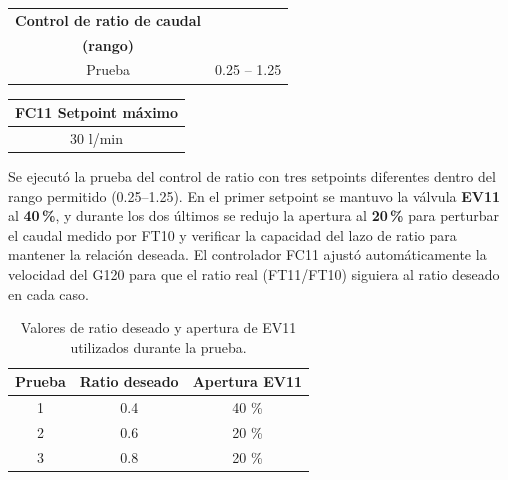 \begin{enumerate}[label=\alph*)]
    \begin{center}
    \renewcommand{\arraystretch}{1.2}
    \begin{tabular}{|c|c|}
        \hline
        \textbf{Control de ratio de caudal} & \makecell[c]{\textbf{Setpoint de Ratio} \\ \textbf{(rango)}} \\\hline
        Prueba & 0.25 -- 1.25 \\\hline
    \end{tabular}
    \end{center}

    \begin{center}
    \renewcommand{\arraystretch}{1.2}
    \begin{tabular}{|c|}
        \hline
        \textbf{FC11 Setpoint máximo} \\\hline
        30 l/min \\\hline
    \end{tabular}
    \end{center}

    Se ejecutó la prueba del control de ratio con tres setpoints diferentes dentro del rango permitido (0.25--1.25). En el primer setpoint se mantuvo la válvula \textbf{EV11} al \textbf{40\,\%}, y durante los dos últimos se redujo la apertura al \textbf{20\,\%} para perturbar el caudal medido por FT10 y verificar la capacidad del lazo de ratio para mantener la relación deseada. El controlador FC11 ajustó automáticamente la velocidad del G120 para que el ratio real (FT11/FT10) siguiera al ratio deseado en cada caso.

    \begin{table}[H]
        \centering
        \renewcommand{\arraystretch}{1.2}
        \begin{tabular}{|c|c|c|}
            \hline
            \textbf{Prueba} & \textbf{Ratio deseado} & \textbf{Apertura EV11} \\ \hline
            1 & 0.4 & 40 \% \\ \hline
            2 & 0.6 & 20 \% \\ \hline
            3 & 0.8 & 20 \% \\ \hline
        \end{tabular}
        \caption{Valores de ratio deseado y apertura de EV11 utilizados durante la prueba.}
        \label{tab:proc_siemens_pruebas_ratio}
    \end{table}






\end{enumerate}
